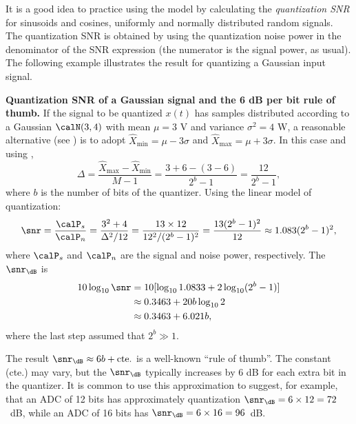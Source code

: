 
It is a good idea to practice using the model by calculating the \emph{quantization SNR} for sinusoids and cosines, uniformly and normally distributed random signals. The quantization SNR is obtained by using the quantization noise power in the denominator of the SNR expression (the numerator is the signal power, as usual). The following example illustrates the result for quantizing a Gaussian input signal.

\bExample \textbf{Quantization SNR of a Gaussian signal and the 6 dB per bit rule of thumb.}
\label{ex:6dbrule}
If the signal to be quantized $x(t)$ has samples distributed according to a Gaussian $\calN(3,4)$ with mean $\mu=3$ V and variance $\sigma^2=4$ W, a reasonable alternative (see ) is to adopt
$\hat X_{\textrm{min}} = \mu - 3 \sigma$ and $\hat X_{\textrm{max}} = \mu + 3 \sigma$.
In this case and using , 
\[
\Delta = \frac{\hat X_{\textrm{max}} - \hat X_{\textrm{min}}}{M-1} = \frac{3+6-(3-6)}{2^b-1} = \frac{12}{2^b-1},
\]
where $b$ is the number of bits of the quantizer. Using the linear model of quantization:
\[
\snr = \frac{\calP_s}{\calP_n} = \frac{3^2+4}{\Delta^2/12} = \frac{13 \times 12}{12^2/(2^b-1)^2} = \frac{13(2^b-1)^2}{12} \approx 1.083 (2^b-1)^2,
\]
where $\calP_s$ and $\calP_n$ are the signal and noise power, respectively. The $\snr_{\dB}$ is
\begin{align*}
10 \log_{10}  \snr &= 10 [\log_{10} 1.0833 + 2\log_{10} (2^b-1)]\\
&\approx 0.3463 + 20 b \log_{10}2\\
&\approx 0.3463 + 6.021 b, 
\end{align*}
where the last step assumed that $2^b \gg 1$.

The result $\snr_{\dB} \approx 6 b + \textrm{cte.}$ is a well-known ``rule of thumb''. The constant (cte.) may vary, but the $\snr_{\dB}$ typically increases by 6 dB for each extra bit in the quantizer. It is common to use this approximation to suggest, for example, that an ADC of 12 bits has approximately quantization $\snr_{\dB} = 6 \times 12 = 72$~dB, while an ADC of 16 bits has $\snr_{\dB} = 6 \times 16 = 96$~dB.
\eExample



